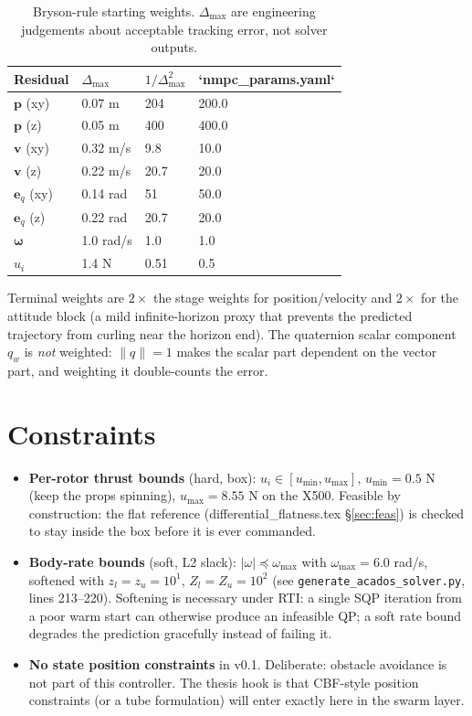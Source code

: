 \documentclass[11pt]{article}
\begin{document}
\begin{table}[h]
\centering
\caption{Bryson-rule starting weights. $\Delta_{\max}$ are engineering judgements about
acceptable tracking error, not solver outputs.}
\label{tab:bryson}
\begin{tabular}{@{}llll@{}}
\toprule
Residual & $\Delta_{\max}$ & $1/\Delta_{\max}^2$ & `nmpc\_params.yaml` \\
\midrule
$\bm p$ (xy) & 0.07 m & 204 & 200.0 \\
$\bm p$ (z) & 0.05 m & 400 & 400.0 \\
$\bm v$ (xy) & 0.32 m/s & 9.8 & 10.0 \\
$\bm v$ (z) & 0.22 m/s & 20.7 & 20.0 \\
$\bm e_q$ (xy) & 0.14 rad & 51 & 50.0 \\
$\bm e_q$ (z) & 0.22 rad & 20.7 & 20.0 \\
$\bm\omega$ & 1.0 rad/s & 1.0 & 1.0 \\
$u_i$ & 1.4 N & 0.51 & 0.5 \\
\bottomrule
\end{tabular}
\end{table}

Terminal weights are $2\times$ the stage weights for position/velocity and $2\times$ for
the attitude block (a mild infinite-horizon proxy that prevents the predicted trajectory
from curling near the horizon end). The quaternion scalar component $q_w$ is \emph{not}
weighted: $\|q\|=1$ makes the scalar part dependent on the vector part, and weighting it
double-counts the error.

\section{Constraints}
\label{sec:constraints}

\begin{itemize}
  \item \textbf{Per-rotor thrust bounds} (hard, box): $u_i \in [u_{\min}, u_{\max}]$,
        $u_{\min} = 0.5$ N (keep the props spinning), $u_{\max} = 8.55$ N on the X500.
        Feasible by construction: the flat reference (differential\_flatness.tex
        \S\ref{sec:feas}) is checked to stay inside the box before it is ever commanded.
  \item \textbf{Body-rate bounds} (soft, L2 slack): $|\omega| \preceq \omega_{\max}$ with
        $\omega_{\max} = 6.0$ rad/s, softened with $z_l = z_u = 10^1$,
        $Z_l = Z_u = 10^2$ (see \texttt{generate\_acados\_solver.py}, lines 213--220).
        Softening is necessary under RTI: a single SQP iteration from a poor warm start can
        otherwise produce an infeasible QP; a soft rate bound degrades the prediction
        gracefully instead of failing it.
  \item \textbf{No state position constraints} in v0.1. Deliberate: obstacle avoidance is
        not part of this controller. The thesis hook is that CBF-style position constraints
        (or a tube formulation) will enter exactly here in the swarm layer.
\end{itemize}
\end{document}
